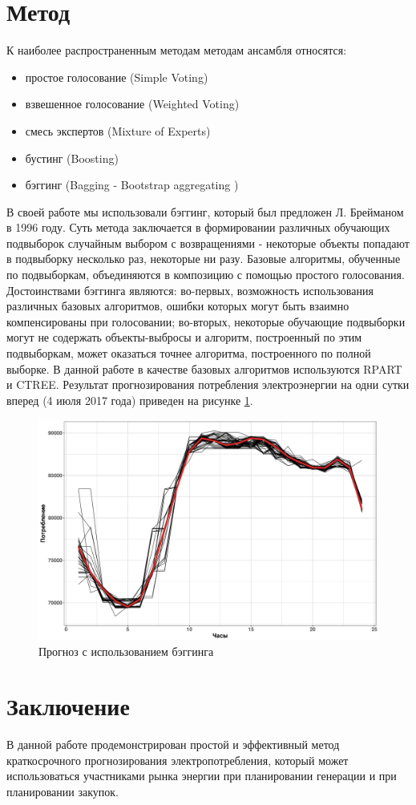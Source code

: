 \documentclass[60x84/16,8pt]{ittmm}
\begin{document}
\section{Метод}
\label{sec:methods}
К наиболее распространенным методам методам ансамбля относятся:
\begin{itemize}
    \item простое голосование (Simple Voting)
    \item взвешенное голосование (Weighted Voting)
    \item смесь экспертов (Mixture of Experts)
    \item бустинг (Boosting)
    \item бэггинг (Bagging - Bootstrap aggregating \cite{Breiman1996})
\end{itemize}
В своей работе мы использовали бэггинг, который был предложен Л. Брейманом в
1996 году. Суть метода заключается в формировании различных обучающих подвыборок
случайным выбором с возвращениями - некоторые объекты попадают в подвыборку
несколько раз, некоторые ни разу. Базовые алгоритмы, обученные по подвыборкам,
объединяются в композицию с помощью простого голосования. Достоинствами бэггинга
являются: во-первых, возможность использования различных базовых алгоритмов,
ошибки которых могут быть взаимно компенсированы при голосовании; во-вторых,
некоторые обучающие подвыборки могут не содержать объекты-выбросы и алгоритм,
построенный по этим подвыборкам, может оказаться точнее алгоритма, построенного
по полной выборке. В данной работе в качестве базовых алгоритмов используются
RPART и CTREE. Результат прогнозирования потребления электроэнергии на одни
сутки вперед (4 июля 2017 года) приведен на рисунке \ref{fig:prediction}.
\begin{figure}
  \centering
  \includegraphics[width=0.6\linewidth]{Ru/prediction.jpg}
  \caption{Прогноз с использованием бэггинга}
  \label{fig:prediction}
\end{figure}


\section{Заключение}
В данной работе продемонстрирован простой и эффективный метод краткосрочного
прогнозирования электропотребления, который может использоваться участниками
рынка энергии при планировании генерации и при планировании закупок.
\end{document}
